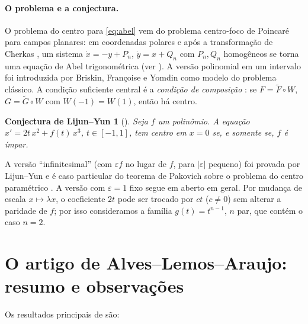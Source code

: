 \documentclass[11pt]{article}
\theoremstyle{plain}
\newtheorem*{conjLY}{Conjectura de Lijun--Yun}
\theoremstyle{definition}
\theoremstyle{remark}
\begin{document}
\paragraph{O problema e a conjectura.}
O problema do centro para \eqref{eq:abel} vem do problema centro-foco de
Poincaré para campos planares: em coordenadas polares e após a transformação
de Cherkas \cite{Che76}, um sistema $\dot x=-y+P_n$, $\dot y=x+Q_n$ com $P_n,Q_n$
homogêneos se torna uma equação de Abel trigonométrica
(ver \cite[\S1.1]{ALA20}). A versão polinomial em um intervalo foi introduzida
por Briskin, Françoise e Yomdin \cite{BFY99,BFY00a,BFY00b} como modelo do problema
clássico. A condição suficiente central é a \emph{condição de composição}
\cite{AL87}: se $F=\tilde F\circ W$, $G=\tilde G\circ W$ com $W(-1)=W(1)$, então
há centro.

\begin{conjLY}[{\cite[Obs.~5.6]{LY01}}]
Seja $f$ um polinômio. A equação $x'=2t\,x^2+f(t)\,x^3$, $t\in[-1,1]$, tem centro
em $x=0$ se, e somente se, $f$ é ímpar.
\end{conjLY}

A versão ``infinitesimal'' (com $\varepsilon f$ no lugar de $f$, para
$|\varepsilon|$ pequeno) foi provada por Lijun--Yun \cite[Teo.~5.5]{LY01} e é caso
particular do teorema de Pakovich sobre o problema do centro paramétrico
\cite{Pak17}. A versão com $\varepsilon=1$ fixo segue em aberto em geral.
Por mudança de escala $x\mapsto\lambda x$, o coeficiente $2t$ pode ser trocado
por $ct$ ($c\ne0$) sem alterar a paridade de $f$; por isso consideramos a
família $g(t)=t^{n-1}$, $n$ par, que contém o caso $n=2$.

\section{O artigo de Alves--Lemos--Araujo: resumo e observações}

Os resultados principais de \cite{ALA20} são:
\end{document}
